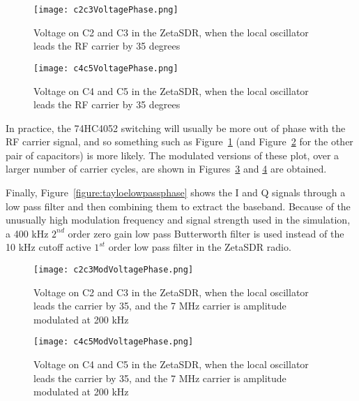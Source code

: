 \documentclass[11pt, twoside]{article}
\begin{document}
\begin{figure}
  \center
  \captionsetup{width=.8\linewidth}
  \texttt{[image: c2c3VoltagePhase.png]}
  \caption{Voltage on C2 and C3 in the ZetaSDR, when the local
    oscillator leads the RF carrier by 35 degrees}
  \label{figure:C2C3phase}
\end{figure}

\begin{figure}
  \center
  \captionsetup{width=.8\linewidth}
  \texttt{[image: c4c5VoltagePhase.png]}
  \caption{Voltage on C4 and C5 in the ZetaSDR, when the local
    oscillator leads the RF carrier by 35 degrees}
  \label{figure:C4C5phase}
\end{figure}

In practice, the 74HC4052 switching will usually be more out of phase
with the RF carrier signal, and so something such as
Figure~\ref{figure:C2C3phase} (and Figure~\ref{figure:C4C5phase} for
the other pair of capacitors) is more likely.  The modulated versions
of these plot, over a larger number of carrier cycles, are shown in
Figures~\ref{figure:C2C3modphase} and \ref{figure:C4C5modphase} are
obtained.

Finally, Figure~\ref{figure:tayloelowpassphase} shows the I and Q
signals through a low pass filter and then combining them to extract
the baseband.  Because of the unusually high modulation frequency and
signal strength used in the simulation, a 400 kHz $2^{nd}$ order zero
gain low pass Butterworth filter is used instead of the 10 kHz cutoff
active $1^{st}$ order low pass filter in the ZetaSDR radio.

\begin{figure}
  \center
  \captionsetup{width=.8\linewidth}
  \texttt{[image: c2c3ModVoltagePhase.png]}
  \caption{Voltage on C2 and C3 in the ZetaSDR, when the local
    oscillator leads the carrier by 35\degree, and the 7 MHz carrier
    is amplitude modulated at 200 kHz}
  \label{figure:C2C3modphase}
\end{figure}

\begin{figure}
  \center
  \captionsetup{width=.8\linewidth}
  \texttt{[image: c4c5ModVoltagePhase.png]}
  \caption{Voltage on C4 and C5 in the ZetaSDR, when the local
    oscillator leads the carrier by 35\degree, and the 7 MHz carrier
    is amplitude modulated at 200 kHz}
  \label{figure:C4C5modphase}
\end{figure}
\end{document}

